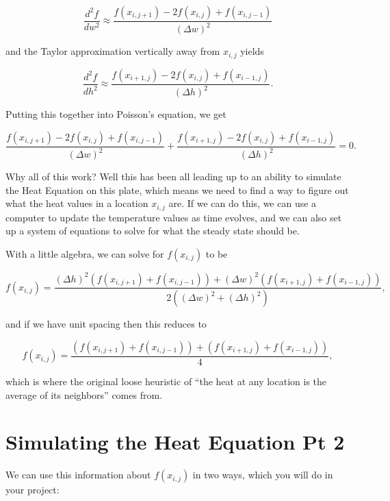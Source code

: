 \documentclass{ximera}
\begin{document}
$$\frac{d^2f}{dw^2}\approx \frac{f(x_{i,j+1})-2f(x_{i,j})+f(x_{i,j-1})}{\left(\Delta w\right)^2}$$

and the Taylor approximation vertically away from $x_{i,j}$ yields

$$\frac{d^2f}{dh^2}\approx \frac{f(x_{i+1,j})-2f(x_{i,j})+f(x_{i-1,j})}{\left(\Delta h\right)^2}.$$

Putting this together into Poisson's equation, we get

$$\frac{f(x_{i,j+1})-2f(x_{i,j})+f(x_{i,j-1})}{\left(\Delta w\right)^2}+\frac{f(x_{i+1,j})-2f(x_{i,j})+f(x_{i-1,j})}{\left(\Delta h\right)^2}=0.$$

Why all of this work? Well this has been all leading up to an ability to simulate the Heat Equation on this plate, which means we need to find a way to figure out what the heat values in a location $x_{i,j}$ are. If we can do this, we can use a computer to update the temperature values as time evolves, and we can also set up a system of equations to solve for what the steady state should be. 

With a little algebra, we can solve for $f(x_{i,j})$ to be

$$f(x_{i,j})=\frac{\left(\Delta h\right)^2(f(x_{i,j+1})+f(x_{i,j-1}))+\left(\Delta w\right)^2(f(x_{i+1,j})+f(x_{i-1,j}))}{2(\left(\Delta w\right)^2+\left(\Delta h\right)^2)},$$

and if we have unit spacing then this reduces to 

$$f(x_{i,j})=\frac{(f(x_{i,j+1})+f(x_{i,j-1}))+(f(x_{i+1,j})+f(x_{i-1,j}))}{4},$$

which is where the original loose heuristic of ``the heat at any location is the average of its neighbors'' comes from.

\section{Simulating the Heat Equation Pt 2}

We can use this information about $f(x_{i,j})$ in two ways, which you will do in your project:
\end{document}
